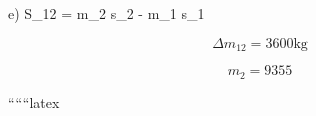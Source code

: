 e) \quad \Delta S_{12} = m_2 s_2 - m_1 s_1

\[
\Delta m_{12} = 3600 \text{kg}
\]

\[
m_2 = 9355
\]

``````latex